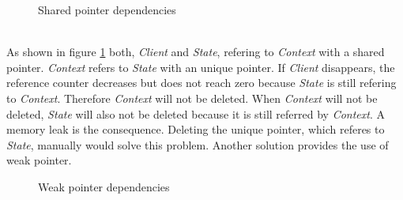 {\begin{figure}[h]{}
\centering
\mbox{}
\caption{Shared pointer dependencies}
\label{fig:sharedPointerDependencies}
\end{figure}

\noindent\\ As shown in figure \ref{fig:sharedPointerDependencies} both, \emph{Client} and \emph{State}, refering to \emph{Context} with a shared pointer. \emph{Context} refers to \emph{State} with an unique pointer. If \emph{Client} disappears, the reference counter decreases but does not reach zero because \emph{State} is still refering to \emph{Context}. Therefore \emph{Context} will not be deleted. When \emph{Context} will not be deleted, \emph{State} will also not be deleted because it is still referred by \emph{Context}. A memory leak is the consequence. Deleting the unique pointer, which referes to \emph{State}, manually would solve this problem. Another solution provides the use of weak pointer. 

\begin{figure}[h]{}
\centering
\mbox{}
\caption{Weak pointer dependencies}
\label{fig:weakPointerDependencies}
\end{figure}

}
